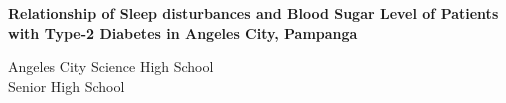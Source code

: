 \begin{titlepage}
    \thispagestyle{titlepagestyle}
    \centering
    \textbf{Relationship of Sleep disturbances and Blood Sugar Level of Patients with Type-2 Diabetes in Angeles City, Pampanga}
    \vspace{50pt}

    
    \vfill
    Angeles City Science High School\\
    Senior High School
\end{titlepage}
